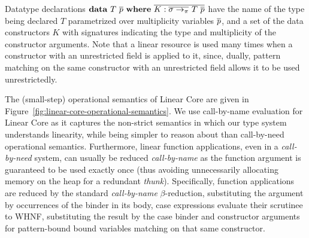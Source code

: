 \documentclass[acmsmall,review,anonymous,screen]{acmart}
\begin{document}

Datatype declarations $\mathbf{data}~T~\overline{p}~\mathbf{where}~\overline{K:\overline{\sigma
\to_\pi}~T~\overline{p} }$ have the name of the type being declared $T$
parametrized over multiplicity variables $\overline{p}$, and a set of the data
constructors $K$ with signatures indicating the type and multiplicity of the
constructor arguments. Note that a linear resource is used many times when a
constructor with an unrestricted field is applied to it, since, dually, pattern
matching on the same constructor with an unrestricted field allows it to be
used unrestrictedly.

\SyntaxFull


The (small-step) operational semantics of Linear Core are given in
Figure~\ref{fig:linear-core-operational-semantics}. We use call-by-name
evaluation for Linear Core as it captures the non-strict semantics in which
our type system understands linearity, while being simpler to reason about than
call-by-need operational semantics.
Furthermore, linear function applications, even in a \emph{call-by-need} system, can
usually be reduced \emph{call-by-name} as the function argument is guaranteed to
be used exactly once (thus avoiding unnecessarily allocating memory on the heap
for a redundant \emph{thunk}).
%
Specifically, function applications are reduced by the standard
\emph{call-by-name} $\beta$-reduction, substituting the argument by
occurrences of the binder in its body, case expressions evaluate their
scrutinee to WHNF, substituting the result by the case binder and constructor
arguments for pattern-bound bound variables matching on that same constructor.
\end{document}
